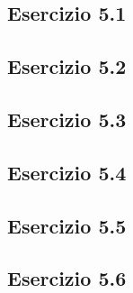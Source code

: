 \subsection{\textbf{Esercizio 5.1}}

\subsection{\textbf{Esercizio 5.2}}

\subsection{\textbf{Esercizio 5.3}}

\subsection{\textbf{Esercizio 5.4}}

\subsection{\textbf{Esercizio 5.5}}

\subsection{\textbf{Esercizio 5.6}}

